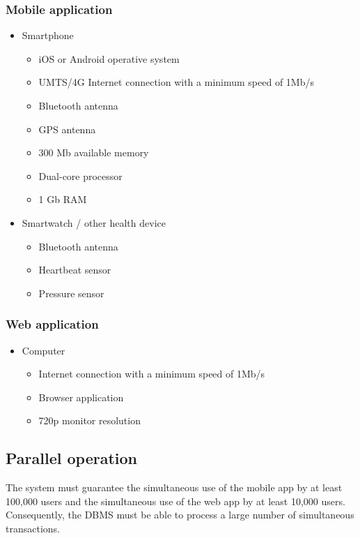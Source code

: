 \subsubsection{Mobile application}
\begin{itemize}
  \item Smartphone
  \begin{itemize}
    \item iOS or Android operative system
    \item UMTS/4G Internet connection with a minimum speed of 1Mb/s
    \item Bluetooth antenna
    \item GPS antenna
    \item 300 Mb available memory
    \item Dual-core processor
    \item 1 Gb RAM
  \end{itemize}
  \item Smartwatch / other health device
  \begin{itemize}
    \item Bluetooth antenna
    \item Heartbeat sensor
    \item Pressure sensor
  \end{itemize}
\end{itemize}

\subsubsection{Web application}
\begin{itemize}
  \item Computer
  \begin{itemize}
    \item Internet connection with a minimum speed of 1Mb/s
    \item Browser application
    \item 720p monitor resolution
  \end{itemize}
\end{itemize}

\subsection{Parallel operation}
The system must guarantee the simultaneous use of the mobile app by at least 100,000 users and the simultaneous use of the web app by at least 10,000 users.
Consequently, the DBMS must be able to process a large number of simultaneous transactions.

